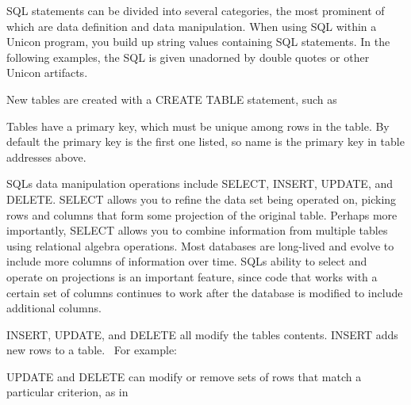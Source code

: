 SQL statements can be divided into several categories, the most
prominent of which are data definition and data manipulation. When
using SQL within a Unicon program, you build up string values
containing SQL statements. In the following examples, the SQL is given
unadorned by double quotes or other Unicon artifacts.

New tables are created with a \textsf{CREATE TABLE} statement, such as


Tables have a primary key, which must be unique among rows in the table.
By default the primary key is the first one listed, so \textsf{name} is
the primary key in table \textsf{addresses} above.

SQL{\textquotesingle}s data manipulation operations include
\textsf{SELECT}, \textsf{INSERT}, \textsf{UPDATE}, and \textsf{DELETE}.
\textsf{SELECT} allows you to refine the data set being operated on,
picking rows and columns that form some projection of the original
table. Perhaps more importantly, \textsf{SELECT} allows you to combine
information from multiple tables using relational algebra operations.
Most databases are long-lived and evolve to include more columns of
information over time. SQL{\textquotesingle}s ability to select and
operate on projections is an important feature, since code that works
with a certain set of columns continues to work after the database is
modified to include additional columns.

\textsf{INSERT}, \textsf{UPDATE}, and \textsf{DELETE} all modify the
table{\textquotesingle}s contents. \textsf{INSERT} adds new rows to a
table. \ For example:


\textsf{UPDATE} and \textsf{DELETE} can modify or remove sets of rows
that match a particular criterion, as in


